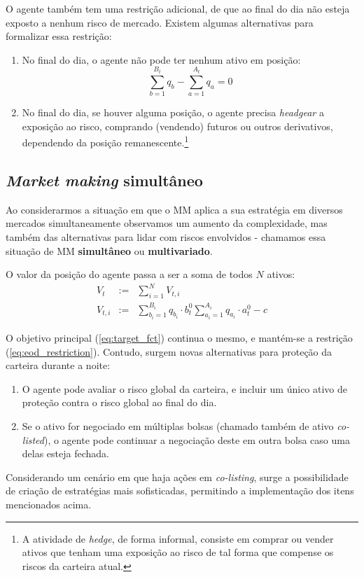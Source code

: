 O agente também tem uma restrição adicional, de que ao final do dia não esteja exposto a nenhum risco de mercado. 
Existem algumas alternativas para formalizar essa restrição:
\begin{enumerate}
    \item No final do dia, o agente não pode ter nenhum ativo em posição: 
    \begin{equation}
        \sum_{b=1}^{B_t} q_b  - \sum_{a=1}^{A_t} q_a = 0\label{eq:eod_restriction}
    \end{equation}
    \item No final do dia, se houver alguma posição, o agente precisa \textit{headgear} a exposição ao risco, comprando (vendendo) futuros ou outros derivativos, dependendo da posição remanescente.\footnote{A atividade de \textit{hedge}, de forma informal, consiste em comprar ou vender ativos que tenham uma exposição ao risco de tal forma que compense os riscos da carteira atual.}
\end{enumerate}

\subsection{\textit{Market making} simultâneo}
Ao considerarmos a situação em que o MM aplica a sua estratégia em diversos mercados simultaneamente observamos um aumento da complexidade, mas também das alternativas para lidar com riscos envolvidos - chamamos essa situação de MM \textbf{simultâneo} ou \textbf{multivariado}.

O valor da posição do agente passa a ser a soma de todos $N$ ativos:
\begin{eqnarray*}
    V_t &:=& \sum_{i=1}^N V_{t,i}\\
    V_{t,i} &:=& \sum_{b_{i}=1}^{B_{i}} q_{b_{i}} \cdot b_{t}^{0} 
    \sum_{a_{i}=1}^{A_{i}} q_{a_{i}} \cdot a_{t}^{0} - c
\end{eqnarray*}

O objetivo principal (\ref{eq:target_fct}) continua o mesmo, e mantém-se a restrição (\ref{eq:eod_restriction}). Contudo, surgem novas alternativas para proteção da carteira durante a noite:

\begin{enumerate}
    \item O agente pode avaliar o risco global da carteira, e incluir um único ativo de proteção contra o risco global ao final do dia.
    \item Se o ativo for negociado em múltiplas bolsas (chamado também de ativo \textit{co-listed}), o agente pode continuar a negociação deste em outra bolsa caso uma delas esteja fechada.
\end{enumerate}

Considerando um cenário em que haja ações em \textit{co-listing}, surge a possibilidade de criação de estratégias mais sofisticadas, permitindo a implementação dos itens mencionados acima.
 
